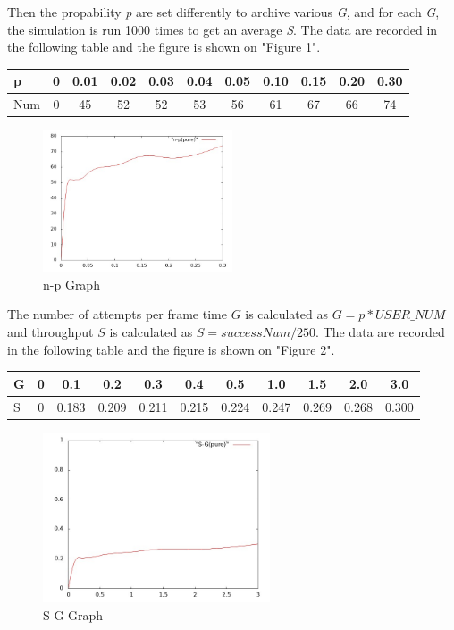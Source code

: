 \documentclass[11pt,a4paper]{report}
\begin{document}
Then the propability \emph{p} are set differently to archive various \emph{G}, and for each \emph{G}, the simulation is run 1000 times to get an average \emph{S}. The data are recorded in the following table and the figure is shown on "Figure 1". \\
\begin{table}[htbp]
\begin{tabular}{lcccccccccc}
\toprule
p & 0 & 0.01 & 0.02  & 0.03 & 0.04 & 0.05 & 0.10 & 0.15 & 0.20 & 0.30 \\
\midrule
Num & 0 & 45 & 52 & 52 & 53 & 56 & 61 & 67 & 66 & 74 \\
\bottomrule
\end{tabular}
\end{table}

\begin{figure}
\centering
\includegraphics[width=0.5\textwidth]{1_1.jpg}
\caption{n-p Graph}
\end{figure}

The number of attempts per frame time \(G\) is calculated as \(G = p*USER\_NUM\) and throughput \(S\) is calculated as \(S = successNum/250\). The data are recorded in the following table and the figure is shown on "Figure 2".
\begin{table}[htbp]
\begin{tabular}{lcccccccccc}
\toprule
G & 0 & 0.1 & 0.2  & 0.3 & 0.4 & 0.5 & 1.0 & 1.5 & 2.0 & 3.0 \\
\midrule
S & 0 & 0.183 & 0.209 & 0.211 & 0.215 & 0.224 & 0.247 & 0.269 & 0.268 & 0.300 \\
\bottomrule
\end{tabular}
\end{table}

\begin{figure}
\centering
\includegraphics[width=0.6\textwidth]{1_2.jpg}
\caption{S-G Graph}
\end{figure}
\end{document}
